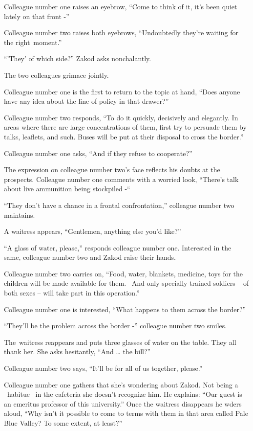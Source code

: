 \documentclass[twoside,11pt]{book}
\begin{document}
Colleague number one raises an eyebrow, ``Come to think of it, it's been quiet lately on that front
-''

Colleague number two raises both eyebrows, ``Undoubtedly they're waiting for the
right~moment.''

``'They' of which side?'' Zakod asks nonchalantly.

The two colleagues grimace jointly.

Colleague number one is the first to return to the topic at hand, ``Does anyone have any idea about the
line of policy in that drawer?''

Colleague number two responds, ``To do it quickly, decisively and elegantly. In areas where there are large
concentrations of them, first try to persuade them by talks, leaflets, and such. Buses will be put at their disposal to
cross the border.''

Colleague number one asks, ``And if they refuse to cooperate?''

The expression on colleague number two's face reflects his doubts at the prospects. Colleague number one comments with a
worried look, ``There's talk about live ammunition being stockpiled -``~

``They don't have a chance in a frontal confrontation,'' colleague number two maintains.

A waitress appears, ``Gentlemen, anything else you'd like?''

``A glass of water, please,'' responds colleague number one. Interested in the same, colleague
number two and Zakod raise their hands.

Colleague number two carries on, ``Food, water, blankets, medicine, toys for the children will be made
available for them. ~And only specially trained soldiers -- of both sexes -- will take part in this
operation.''

Colleague number one is interested, ``What happens to them across the border?''

``They'll be the problem across the border -'' colleague number two smiles.

The~waitress reappears and puts three glasses of water on the table. They all thank her. She asks hesitantly,
``And {\dots} the bill?''

Colleague number two says, ``It'll be for all of us together, please.''

Colleague number one gathers that she's wondering about Zakod. Not being a \ habitue \ in the cafeteria she doesn't
recognize him. He explains: ``Our guest is an emeritus professor of this university.'' Once
the waitress disappears he wders aloud, ``Why isn't it possible to come to terms with them in that area
called Pale Blue Valley? To some extent, at least?''
\end{document}
